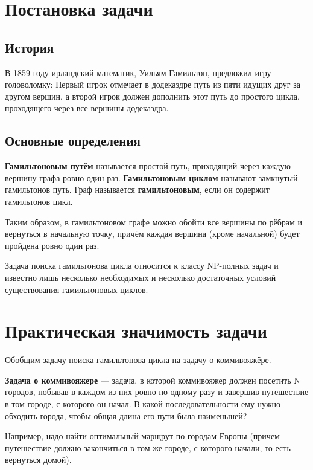 





\tableofcontents
\newpage

\section{Постановка задачи}

\subsection{История}
В 1859 году ирландский математик, Уильям Гамильтон, предложил игру-головоломку:
Первый игрок отмечает в додекаэдре путь из пяти идущих друг за другом вершин, а второй игрок должен дополнить этот путь до простого цикла, проходящего
через все вершины додекаэдра.

\subsection{Основные определения}
{\bf Гамильтоновым путём} называется простой путь, приходящий через каждую вершину графа ровно один раз.
{\bf Гамильтоновым циклом} называют замкнутый гамильтонов путь.
Граф называется {\bf гамильтоновым}, если он содержит гамильтонов цикл.

Таким образом, в гамильтоновом графе можно обойти все вершины по рёбрам и вернуться в начальную точку, причём каждая вершина (кроме начальной) будет пройдена ровно один раз.

Задача поиска гамильтонова цикла относится к классу NP-полных задач и известно лишь несколько необходимых и несколько достаточных условий существования гамильтоновых циклов.

\section{Практическая значимость задачи}
Обобщим задачу поиска гамильтонова цикла на задачу о коммивояжёре.

{\bf Задача о коммивояжере} — задача, в которой коммивояжер должен посетить N городов, побывав в каждом из них ровно по одному разу и завершив путешествие в том городе, с которого он начал.
В какой последовательности ему нужно обходить города, чтобы общая длина его пути была наименьшей?

Например, надо найти оптимальный марщрут по городам Европы (причем путешествие должно закончиться в том же городе, с которого начали, то есть вернуться домой).

